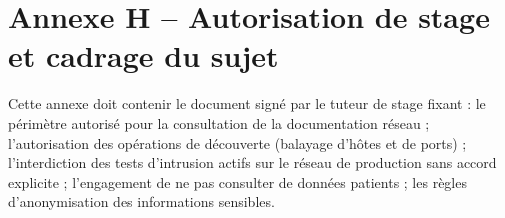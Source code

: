 
\section*{Annexe H -- Autorisation de stage et cadrage du sujet}

Cette annexe doit contenir le document signé par le tuteur de stage fixant : le périmètre autorisé pour la consultation de la documentation réseau ; l'autorisation des opérations de découverte (balayage d'hôtes et de ports) ; l'interdiction des tests d'intrusion actifs sur le réseau de production sans accord explicite ; l'engagement de ne pas consulter de données patients ; les règles d'anonymisation des informations sensibles.

